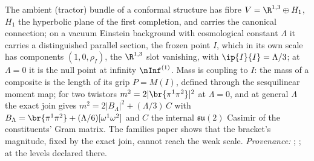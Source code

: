 The ambient (tractor) bundle of a conformal structure has fibre $V = \R^{1,3} \oplus H_{1}$, $H_{1}$ the hyperbolic plane of the first completion, and carries the canonical connection; on a vacuum Einstein background with cosmological constant $\Lambda$ it carries a distinguished parallel section, the frozen point $I$, which in its own scale has components $(1, 0, \rho_{I})$, the $\R^{1,3}$ slot vanishing, with $\ip{I}{I} = \Lambda/3$; at $\Lambda = 0$ it is the null point at infinity $\nInf^{(1)}$. Mass is coupling to $I$: the mass of a composite is the length of its grip $P = M(I)$, defined through the sesquilinear moment map; for two twistors $m^{2} = 2|\br{\pi^{1}\pi^{2}}|^{2}$ at $\Lambda = 0$, and at general $\Lambda$ the exact join gives $m^{2} = 2|B_{\Lambda}|^{2} + (\Lambda/3)\,C$ with $B_{\Lambda} = \br{\pi^{1}\pi^{2}} + (\Lambda/6)[\omega^{1}\omega^{2}]$ and $C$ the internal $\mathfrak{su}(2)$ Casimir of the constituents' Gram matrix. The families paper shows that the bracket's magnitude, fixed by the exact join, cannot reach the weak scale. \emph{Provenance:} \cite[Fact~2.1, Def.~5.4, Prop.~4.1, Thm.~5.6]{ButlerT11}; \cite[Prop.~4.3]{ButlerT13}; at the levels declared there.
